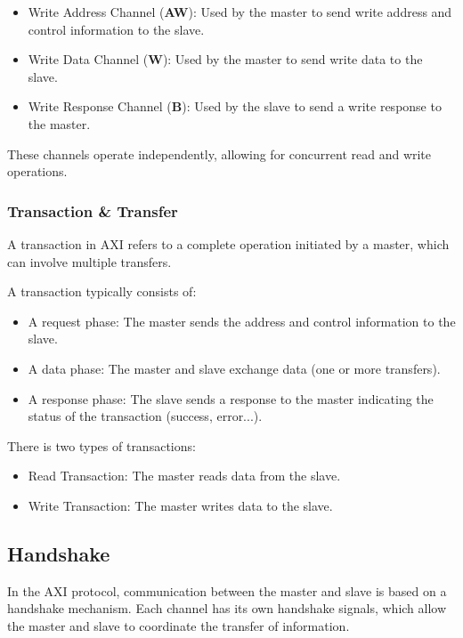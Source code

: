 \begin{multicols}{2}
\begin{itemize}
    \item Write Address Channel (\textbf{AW}): Used by the master to send write address and control information to the slave.

    \item Write Data Channel (\textbf{W}): Used by the master to send write data to the slave.

    \item  Write Response Channel (\textbf{B}): Used by the slave to send a write response to the master. 
\end{itemize}

These channels operate independently, allowing for concurrent read and write operations. 
\end{multicols}



\subsubsection{Transaction \& Transfer}
A transaction in AXI refers to a complete operation initiated by a master, which can involve multiple transfers.

A transaction typically consists of:

\begin{itemize}
    \item A request phase: The master sends the address and control information to the slave.

    \item  A data phase: The master and slave exchange data (one or more transfers).

    \item A response phase: The slave sends a response to the master indicating the status of the transaction (success, error...).
\end{itemize}

There is two types of transactions:
\begin{itemize}
    \item Read Transaction: The master reads data from the slave.
    \item Write Transaction: The master writes data to the slave.
\end{itemize}

\subsection{Handshake}

In the AXI protocol, communication between the master and slave is based on a handshake mechanism. Each channel has its own handshake signals, which allow the master and slave to coordinate the transfer of information.

